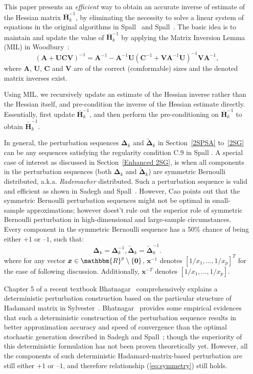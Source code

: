 \documentclass[conference,10.6cpt]{IEEEtran}
\newcommand{\bDelta}{\bm{\Delta}}
\newcommand{\oH}{\bm{\overline{H}}}
\newcommand{\ooH}{\bm{\overline{\overline{H}}}}
\newcommand{\tDelta}{\bm{\tilde{\Delta}}}
\begin{document}
This paper presents an \textit{efficient} way to obtain an accurate inverse of
estimate of the Hessian matrix $\oH_k^{-1}$, by eliminating the necessity to solve a
linear system of equations in the original algorithms in Spall~\cite{Spall2000} and Spall~\cite{Spall2009}. The basic idea is to maintain and update the
value of $\oH_k^{-1}$ by applying the Matrix Inversion Lemma (MIL) in Woodbury~\cite{Woodbury1950}:
\begin{equation}
\label{eq:MatrixInversion}
(\bm{A}+\bm{UCV})^{-1}=\bm{A}^{-1}-\bm{A}^{-1}\bm{U}(\bm{C}^{-1}+\bm{V}\bm{A}^{-1}\bm{U})^{-1}\bm{V}\bm{A}^{-1},
\end{equation}
where $\bm{A}$, $\bm{U}$, $\bm{C}$ and $\bm{V}$
are of the correct (comformable) sizes and the denoted matrix inverses
exist.

Using MIL, we recursively update an estimate of the
Hessian inverse rather than the Hessian itself, and
pre-condition the inverse of the Hessian estimate directly. Essentially, first update $ \oH_k^{-1} $, and then
perform the pre-conditioning on $ \oH_k^{-1} $ to obtain $\ooH_k^{-1}$.

In general, the perturbation sequences $\bDelta_k$ and
$\tDelta_k$ in Section~\ref{2SPSA} to~\ref{2SG} can be any sequences
satisfying the regularity condition C.9 in Spall
\cite{Spall2009}. A special case of interest as discussed in
Section~\ref{Enhanced 2SG}, is when
all components in the perturbation sequences (both $ \bDelta_k $ and
$\tDelta_k $) are symmetric Bernoulli distributed,
a.k.a. \textit{Rademacher} distributed. Such a perturbation sequence
is valid and efficient as shown in Sadegh and Spall~\cite{Sadegh1998}. However, Cao \cite{Cao2011} points out that the symmetric Bernoulli perturbation sequences might not be optimal in small-sample approximations; however \cite{Cao2011} doest't rule out the superior role of symmetric Bernoulli perturbation in high-dimensional and large-sample circumstances. Every component in the symmetric Bernoulli sequence has a 50\% chance of being either $+1$ or
$\text{--}1$, such that:
\begin{equation} \label{eq:symmetry}
\bDelta_k=\bDelta_k^{-1}, \tDelta_k=\tDelta_k^{-1}.
\end{equation}
where for any vector
$ \bm{x}\in \mathbbm{R}^p \setminus \{\bm{0}\} $, 
$\bm{x}^{-1}$ denotes $[1/x_1, \ldots, 1/x_p]^T$ for the ease of following discussion. Additionally, $ \bm{x}^{-T} $ denotes $[1/x_1, \ldots, 1/x_p]$.

Chapter 5 of a recent textbook Bhatnagar~\cite{Bhatnagar2012} comprehensively explains a deterministic perturbation construction based on the particular structure of Hadamard matrix in Sylvester~\cite{Sylvester1867}. Bhatnagar~\cite{Bhatnagar2003} provides some empirical evidences that such a deterministic construction of the
perturbation sequence results in better approximation
accuracy and speed of convergence than the optimal stochastic
generation described in Sadegh and Spall~\cite{Sadegh1998}; though
the superiority of this deterministic formulation has not been proven theoretically yet. However, all the components of
such deterministic
Hadamard-matrix-based perturbation are still either $+1$ or $\text{--}1$,
and therefore relationship (\ref{eq:symmetry}) still holds.
\end{document}
